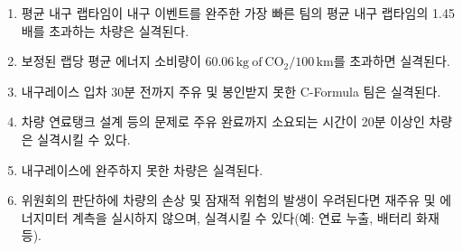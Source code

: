 \documentclass[final,a4paper,10pt]{report}
\begin{document}
{\begin{enumerate}
    \begin{enumerate}
      \item\label{rule:formula-competition.energy-efficiency.disqualification-grounds.laptime-over-145pct} 평균 내구 랩타임이 내구 이벤트를 완주한 가장 빠른 팀의 평균 내구 랩타임의 1.45배를 초과하는 차량은 실격된다.
      \item\label{rule:formula-competition.energy-efficiency.disqualification-grounds.co2-consumption-over-limit} 보정된 랩당 평균 에너지 소비량이 $60.06\,\mathrm{kg\ of\ CO_2}/100\,\mathrm{km}$를 초과하면 실격된다.
      \item\label{rule:formula-competition.energy-efficiency.disqualification-grounds.late-refuel-seal-30min} 내구레이스 입차 30분 전까지 주유 및 봉인받지 못한 C-Formula 팀은 실격된다.
      \item\label{rule:formula-competition.energy-efficiency.disqualification-grounds.refuel-over-20min} 차량 연료탱크 설계 등의 문제로 주유 완료까지 소요되는 시간이 20분 이상인 차량은 실격시킬 수 있다.
      \item\label{rule:formula-competition.energy-efficiency.disqualification-grounds.dnf-disqualifies} 내구레이스에 완주하지 못한 차량은 실격된다.
      \item\label{rule:formula-competition.energy-efficiency.disqualification-grounds.damage-hazard-disqualify} 위원회의 판단하에 차량의 손상 및 잠재적 위험의 발생이 우려된다면 재주유 및 에너지미터 계측을 실시하지 않으며, 실격시킬 수 있다(예: 연료 누출, 배터리 화재 등).
    \end{enumerate}
\end{enumerate}

}
\end{document}
